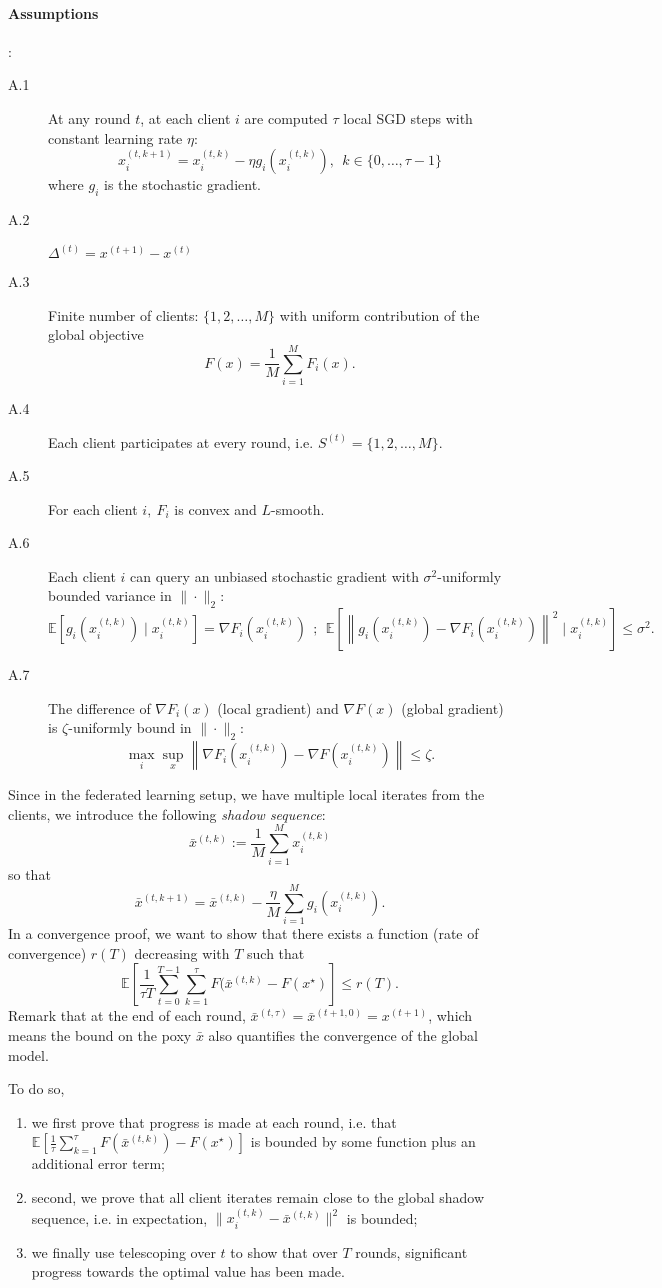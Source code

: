 \documentclass[10pt,a4paper]{book}
\theoremstyle{definition}
\theoremstyle{plain}
\theoremstyle{remark}
\newcommand \Esp {\mathbb{E}}
\begin{document}
\paragraph{Assumptions}: 
\begin{description}
\item[A.1] At any round $t$, at each client $i$ are computed $\tau$ local SGD steps with constant learning rate $\eta$:
$$x_i^{(t,k+1)}=x_i^{(t,k)}-\eta g_i(x_i^{(t,k)}),~~k \in \{0,\dots, \tau-1\}$$
where $g_i$ is the stochastic gradient.
\item[A.2] $\Delta^{(t)}=x^{(t+1)}-x^{(t)}$
\item[A.3] Finite number of clients: $\{1,2,\dots, M\}$ with uniform contribution of the global objective
$$F(x)=\frac{1}{M}\sum_{i=1}^{M}F_i(x).$$
\item[A.4] Each client participates at every round, i.e. $S^{(t)}=\{1,2,\dots, M\}$.
\item[A.5] For each client $i,~F_i$ is convex and $L$-smooth.
\item[A.6] Each client $i$ can query an unbiased stochastic gradient with $\sigma^2$-uniformly bounded variance in $\|\cdot\|_2$:
$$\Esp\left[g_i(x^{(t,k)}_i) \mid x_i^{(t,k)}\right]=\nabla F_i(x_i^{(t,k)})~~;~~\Esp \left[\left\|g_i(x_i^{(t,k)})-\nabla F_i(x_i^{(t,k)})\right\|^2 \mid x_i^{(t,k)}\right]\leq \sigma^2.$$
\item[A.7] The difference of $\nabla F_i(x)$ (local gradient) and $\nabla F(x)$ (global gradient) is $\zeta$-uniformly bound in $\|\cdot \|_2$:
$$\max_i \sup_x\left\|\nabla F_i(x_i^{(t,k)})-\nabla F(x_i^{(t,k)})\right\|\leq \zeta.$$
\end{description}

Since in the federated learning setup, we have multiple local iterates from the clients, we introduce the following \emph{shadow sequence}:
$$\bar{x}^{(t,k)}:=\frac{1}{M}\sum_{i=1}^{M}x_i^{(t,k)}$$
so that
$$\bar{x}^{(t,k+1)}=\bar{x}^{(t,k)}-\frac{\eta}{M}\sum_{i=1}^{M}g_i(x_i^{(t,k)}).$$
In a convergence proof, we want to show that there exists a function (rate of convergence) $r(T)$ decreasing with $T$ such that
$$\Esp\left[\frac{1}{\tau T}\sum_{t=0}^{T-1}\sum_{k=1}^{\tau}F(\bar{x}^{(t,k)}-F(x^{\star})\right]\leq r(T).$$
Remark that at the end of each round, $\bar{x}^{(t,\tau)}=\bar{x}^{(t+1,0)}=x^{(t+1)}$, which means the bound on the poxy $\bar{x}$ also quantifies the convergence of the global model.
\par \medskip
To do so,
\begin{enumerate}
\item we first prove that progress is made at each round, i.e. that $\Esp \left[\frac{1}{\tau}\sum_{k=1}^{\tau}F(\bar{x}^{(t,k)})-F(x^{\star})\right]$ is bounded by some function plus an additional error term;
\item second, we prove that all client iterates remain close to the global shadow sequence, i.e. in expectation, $\|x_i^{(t,k)}-\bar{x}^{(t,k)}\|^2$ is bounded;
\item we finally use telescoping over $t$ to show that over $T$ rounds, significant progress towards the optimal value has been made.
\end{enumerate}

\newpage 



\end{document}
